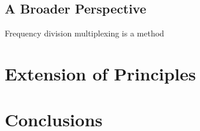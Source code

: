 \documentclass[12pt]{article}
\begin{document}
\subsection{A Broader Perspective}

Frequency division multiplexing is a method 

\section{Extension of Principles}


\section{Conclusions}
\end{document}
